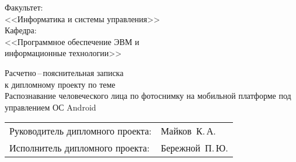 \thispagestyle{fancy}


\vspace*{2cm}

\begin{flushright}
	\Large{ Факультет: }\\
	\large{ <<Информатика и системы управления>> }\\
	\Large{ Кафедра: }\\
	\large{ <<Программное обеспечение ЭВМ и\\ 
		информационные технологии>> }
\end{flushright}

\vspace{2cm}

\begin{LARGE} 
	\begin{center} 
		Расчетно\,--\,пояснительная записка\\
		к дипломному проекту по теме\\ 
		\vspace{2cm}
        Распознавание человеческого лица по фотоснимку на мобильной
        платформе под управлением ОС Android
	\end{center}
\end{LARGE}

\vspace{5cm}

\begin{flushright}
	\begin{tabular}{ll}
	Руководитель дипломного проекта:&Майков~К.\,А.\\
	Исполнитель дипломного проекта:&Бережной~П.\,Ю.
	\end{tabular}
\end{flushright}

\newpage
\setcounter{page}{1}
